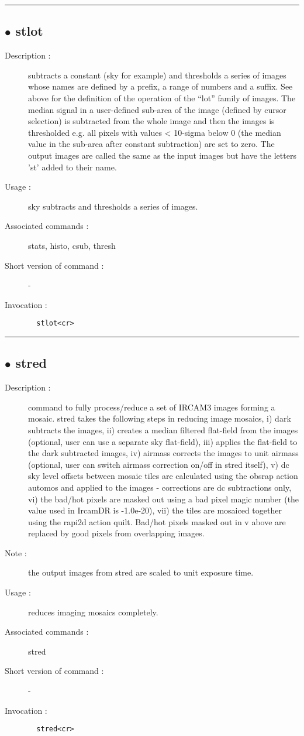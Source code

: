 \hrule \subsection*{$\bullet$ stlot}
\begin{description}
\item[Description :] subtracts a constant (sky for example) and thresholds a series of
images whose names are defined by a prefix, a range of numbers and a
suffix. See above for the definition of the operation of the ``lot'' family
of images.  The median signal in a user-defined sub-area of the image
(defined by cursor selection) is subtracted from the whole image and then
the images is thresholded e.g. all pixels with values < 10-sigma below 0
(the median value in the sub-area after constant subtraction) are set to
zero.  The output images are called the same as the input images but have
the letters 'st' added to their name.
\item[Usage :] sky subtracts and thresholds a series of images.
\item[Associated commands :] stats, histo, csub, thresh
\item[Short version of command :] -
\item[Invocation :]

\verb+  stlot<cr> +\end{description}

\hrule \subsection*{$\bullet$ stred}
\begin{description}
\item[Description :] command to fully process/reduce a set of {\sc IRCAM3} images forming a
mosaic. stred takes the following steps in reducing image mosaics, i)
dark subtracts the images, ii) creates a median filtered flat-field from
the images (optional, user can use a separate sky flat-field), iii)
applies the flat-field to the dark subtracted images, iv) airmass
corrects the images to unit airmass (optional, user can switch airmass
correction on/off in stred itself), v) dc sky level offsets between
mosaic tiles are calculated using the obsrap action automos and applied
to the images - corrections are dc subtractions only, vi) the bad/hot
pixels are masked out using a bad pixel magic number (the value used in
IrcamDR is -1.0e-20), vii) the tiles are mosaiced together using the
rapi2d action quilt.  Bad/hot pixels masked out in v above are replaced
by good pixels from overlapping images.
\item[Note :] the output images from stred are scaled to unit exposure time.
\item[Usage :] reduces imaging mosaics completely.
\item[Associated commands :] stred
\item[Short version of command :] -
\item[Invocation :]

\verb+  stred<cr> +\end{description}

